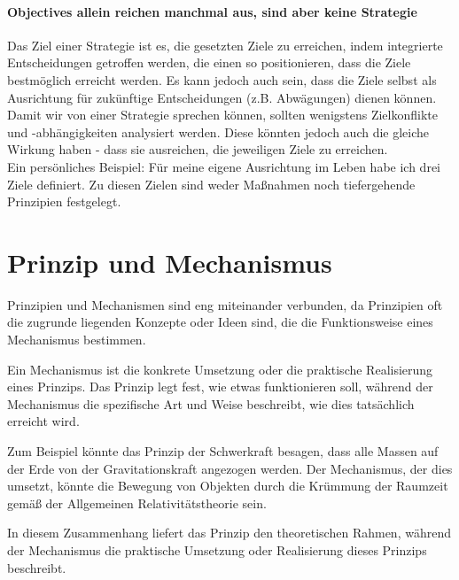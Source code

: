 \paragraph{Objectives allein reichen manchmal aus, sind aber keine Strategie}

Das Ziel einer Strategie ist es, die gesetzten Ziele zu erreichen, indem integrierte Entscheidungen getroffen werden, die einen so positionieren, dass die Ziele bestmöglich erreicht werden. Es kann jedoch auch sein, dass die Ziele selbst als Ausrichtung für zukünftige Entscheidungen (z.B. Abwägungen) dienen können.\\

Damit wir von einer Strategie sprechen können, sollten wenigstens Zielkonflikte und -abhängigkeiten analysiert werden. Diese könnten jedoch auch die gleiche Wirkung haben - dass sie ausreichen, die jeweiligen Ziele zu erreichen.\\

Ein persönliches Beispiel: Für meine eigene Ausrichtung im Leben habe ich drei Ziele definiert. Zu diesen Zielen sind weder Maßnahmen noch tiefergehende Prinzipien festgelegt.

\section{Prinzip und Mechanismus}\label{Appendix_Erlaeuterung_Prinzip}

Prinzipien und Mechanismen sind eng miteinander verbunden, da Prinzipien oft die zugrunde liegenden Konzepte oder Ideen sind, die die Funktionsweise eines Mechanismus bestimmen.

Ein Mechanismus ist die konkrete Umsetzung oder die praktische Realisierung eines Prinzips. Das Prinzip legt fest, wie etwas funktionieren soll, während der Mechanismus die spezifische Art und Weise beschreibt, wie dies tatsächlich erreicht wird.

Zum Beispiel könnte das Prinzip der Schwerkraft besagen, dass alle Massen auf der Erde von der Gravitationskraft angezogen werden. Der Mechanismus, der dies umsetzt, könnte die Bewegung von Objekten durch die Krümmung der Raumzeit gemäß der Allgemeinen Relativitätstheorie sein.

In diesem Zusammenhang liefert das Prinzip den theoretischen Rahmen, während der Mechanismus die praktische Umsetzung oder Realisierung dieses Prinzips beschreibt.
